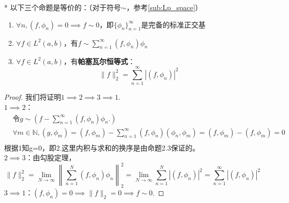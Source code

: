 \begin{theorem}*
以下三个命题是等价的：（对于符号$\sim$，参考\ref{sub:Lp_space}）
\begin{enumerate}
    \item $\forall n,(f,\phi_n)=0\implies f\sim 0$，即$\{\phi_n\}_{n=1}^{\infty}$是完备的标准正交基
    \item $\forall f\in L^2(a,b)$，有$f\sim\sum_{n=1}^{\infty}(f,\phi_n)\phi_n$
    \item $\forall f\in L^2(a,b)$，有\textbf{帕塞瓦尔恒等式}：
          \[\|f\|_2^2=\sum_{n=1}^{\infty}|(f,\phi_n)|^2\]
\end{enumerate}
\end{theorem}
\begin{proof}
我们将证明$1\implies 2\implies 3\implies 1$.\\
$1\implies 2$：\begin{align*}
     & \text{令}g\sim \left(f-\sum_{n=1}^{\infty}(f,\phi_n)\phi_n.\right)                                                              \\
     & \forall m\in\mathbb{N},\left(g,\phi_m\right)=\left(f,\phi_m\right)-\sum_{n=1}^{\infty}\left(f,\phi_n\right)\left(\phi_n,\phi_m\right)=\left(f,\phi_m\right)-\left(f,\phi_m\right)=0 \\
\end{align*}
根据1知g=0，即2.这里内积与求和的换序是由命题2.3保证的。\\
$2\implies 3$：由勾股定理，
\[\|f\|_2^2=\lim_{N\to\infty}\left\|\sum_{n=1}^{N}(f,\phi_n)\phi_n\right\|_2^2=\lim_{N\to\infty}\sum_{n=1}^{N}|(f,\phi_n)|^2=\sum_{n=1}^{\infty}|(f,\phi_n)|^2\]
$3\implies 1$：$(f,\phi_n)=0\implies\|f\|_2=0\implies f\sim 0$.
\end{proof}
